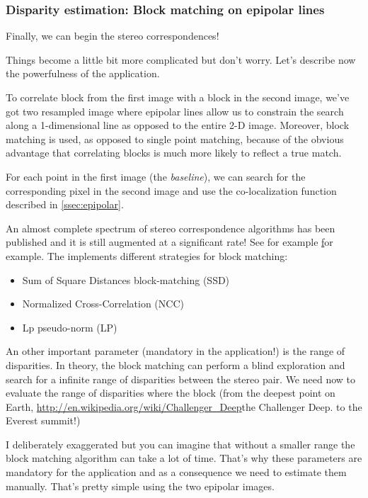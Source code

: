 \subsubsection{Disparity estimation: Block matching on epipolar lines}

Finally, we can begin the stereo correspondences!

Things become a little bit more complicated but don't worry. Let's describe
now the powerfulness of the  application.

To correlate block from the first image with a block in the second image, we've
got two resampled image where epipolar lines allow us to constrain the
search along a 1-dimensional line as opposed to the entire 2-D
image. Moreover, block matching is used, as opposed to single point matching,
because of the obvious advantage that correlating blocks is much more likely to
reflect a true match.

For each point in the first image (the \textit{baseline}), we can search for the
corresponding pixel in the second image and use the co-localization function
described in \ref{ssec:epipolar}.

An almost complete spectrum of stereo correspondence algorithms has been
published and it is still augmented at a significant rate!
See for example \href{http://en.wikipedia.org/wiki/Block-matching_algorithm} for example. The
\otb implements different strategies for block matching:

\begin{itemize}
\item Sum of Square Distances block-matching (SSD)
\item Normalized Cross-Correlation (NCC)
\item Lp pseudo-norm (LP)
\end{itemize}

An other important parameter (mandatory in the application!) is the range of
disparities. In theory, the block matching can perform a blind exploration and
search for a infinite range of disparities between the stereo pair. We need now
to evaluate the range of disparities where the block (from the deepest point on
Earth, \url{http://en.wikipedia.org/wiki/Challenger_Deep}{the Challenger Deep}.
to the Everest summit!)

I deliberately exaggerated but you can imagine that without a smaller range 
the block matching algorithm can take a lot of time.  That's why
these parameters are mandatory for the application and as a consequence we need to
estimate them manually. That's pretty simple using the two epipolar images.

